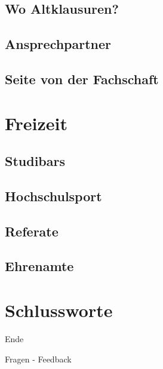 \documentclass[
	aspectratio=169, 
	8pt 
]{beamer}
\begin{document}
\subsection{Wo Altklausuren?}
\subsection{Ansprechpartner}
\subsection{Seite von der Fachschaft}


\section{Freizeit}
\subsection{Studibars}
\subsection{Hochschulsport}
\subsection{Referate}
\subsection{Ehrenamte}



\section{Schlussworte}
\begin{frame}{Ende}
\begin{center}
    Fragen - Feedback
\end{center}
\end{frame}
\end{document}
